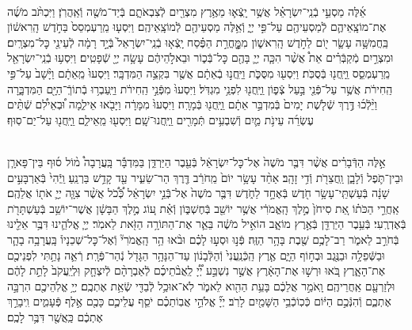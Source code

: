 \documentclass[twoside, openany, parskip=half, 11pt]{book}
\begin{document}
\begin{footnotesize}
\begin{multicols}{2}
\\
אֵ֜לֶּה מַסְעֵ֣י בְֿנֵֽי־יִשְׂרָאֵ֗ל אֲשֶׁ֥ר יָֽצְֿא֛וּ מֵאֶ֥רֶץ מִצְרַ֖יִם לְֿצִבְאֹתָ֑ם בְּֿיַד־מֹשֶׁ֖ה וְֿאַֽהֲרֹֽן׃ וַיִּכְתֹּ֨ב מֹשֶׁ֜ה אֶת־מוֹצָֽאֵיהֶ֛ם לְֿמַסְעֵיהֶ֖ם עַל־פִּ֣י יְיָ֑ וְֿאֵ֥לֶּה מַסְעֵיהֶ֖ם לְֿמוֹצָֽאֵיהֶֽם׃ וַיִּסְע֤וּ מֵֽרַעְמְסֵס֙ בַּחֹ֣דֶשׁ הָֽרִאשׁ֔וֹן בַּֽחֲמִשָּׁ֥ה עָשָׂ֛ר י֖וֹם לַחֹ֣דֶשׁ הָֽרִאשׁ֑וֹן מִמׇׇׇׇׇׇָּֽחֳרַ֣ת הַפֶּ֗סַח יָֽצְֿא֤וּ בְֿנֵֽי־יִשְׂרָאֵל֙ בְּֿיָ֣ד רָמָ֔ה לְֿעֵינֵ֖י כׇּל־מִצְרָֽיִם׃  וּמִצְרַ֣יִם מְֿקַבְּֿרִ֗ים אֵת֩ אֲשֶׁ֨ר הִכָּ֧ה יְיָ֛ בָּהֶ֖ם כׇּל־בְּֿכ֑וֹר וּבֵאלֹ֣הֵיהֶ֔ם עָשָׂ֥ה יְיָ֖ שְֿׁפָטִֽים׃ וַיִּסְע֥וּ בְֿנֵֽי־יִשְׂרָאֵ֖ל מֵֽרַעְמְסֵ֑ס וַֽיַּֽחֲנ֖וּ בְּֿסֻכֹּֽת׃ וַיִּסְע֖וּ מִסֻּכֹּ֑ת וַיַּֽחֲנ֣וּ בְֿאֵתָ֔ם אֲשֶׁ֖ר בִּקְצֵ֥ה הַמִּדְבָּֽר׃  וַיִּסְעוּ֙ מֵֽאֵתָ֔ם וַיָּ֨שָׁב֙ עַל־פִּ֣י הַֽחִירֹ֔ת אֲשֶׁ֥ר עַל־פְּֿנֵ֖י בַּ֣עַל צְֿפ֑וֹן וַֽיַּֽחֲנ֖וּ לִפְנֵ֥י מִגְדֹּֽל׃ וַיִּסְעוּ֙ מִפְּֿנֵ֣י הַֽחִירֹ֔ת וַיַּֽעַבְר֥וּ בְֿתוֹךְֿ־הַיָּ֖ם הַמִּדְבָּ֑רָה וַיֵּ֨לְֿכ֜וּ דֶּ֣רֶךְ שְֿׁלֹ֤שֶׁת יָמִים֙ בְּֿמִדְבַּ֣ר אֵתָ֔ם וַֽיַּֽחֲנ֖וּ בְּֿמָרָֽה׃ וַיִּסְעוּ֙ מִמָּרָ֔ה וַיָּבֹ֖אוּ אֵילִ֑מָה וּ֠בְאֵילִ֠ם שְֿׁתֵּ֨ים עֶשְׂרֵ֜ה עֵינֹ֥ת מַ֛יִם וְֿשִׁבְעִ֥ים תְּֿמָרִ֖ים וַֽיַּֽחֲנוּ־שָֽׁם׃ וַיִּסְע֖וּ מֵֽאֵילִ֑ם וַֽיַּֽחֲנ֖וּ עַל־יַם־סֽוּף׃

\\
אֵ֣לֶּה הַדְּֿבָרִ֗ים אֲשֶׁ֨ר דִּבֶּ֤ר מֹשֶׁה֙ אֶל־כׇּל־יִשְׂרָאֵ֔ל בְּֿעֵ֖בֶר הַיַּרְדֵּ֑ן בַּמִּדְבָּ֡ר בָּֽעֲרָבָה֩ מ֨וֹל ס֜וּף בֵּין־פָּארָ֧ן וּבֵין־תֹּ֛פֶל וְֿלָבָ֑ן וַֽחֲצֵרֹ֖ת וְֿדִ֥י זָהָֽב׃ אַחַ֨ד עָשָׂ֥ר יוֹם֙ מֵֽחֹרֵ֔ב דֶּ֖רֶךְ הַר־שֵׂעִ֑יר עַ֖ד קָדֵ֥שׁ בַּרְנֵֽעַ׃ וַֽיְֿהִי֙ בְּֿאַרְבָּעִ֣ים שָׁנָ֔ה בְּֿעַשְׁתֵּֽי־עָשָׂ֥ר חֹ֖דֶשׁ בְּֿאֶחָ֣ד לַחֹ֑דֶשׁ דִּבֶּ֤ר מֹשֶׁה֙ אֶל־בְּֿנֵ֣י יִשְׂרָאֵ֔ל כְּֿ֠כֹ֠ל אֲשֶׁ֨ר צִוָּ֧ה יְיָ֛ אֹת֖וֹ אֲלֵהֶֽם׃  אַֽחֲרֵ֣י הַכֹּת֗וֹ אֵ֚ת סִיחֹן֙ מֶ֣לֶךְ הָֽאֱמֹרִ֔י אֲשֶׁ֥ר יוֹשֵׁ֖ב בְּֿחֶשְׁבּ֑וֹן וְֿאֵ֗ת ע֚וֹג מֶ֣לֶךְ הַבָּשָׁ֔ן אֲשֶׁר־יוֹשֵׁ֥ב בְּֿעַשְׁתָּרֹ֖ת בְּֿאֶדְרֶֽעִי׃ בְּֿעֵ֥בֶר הַיַּרְדֵּ֖ן בְּֿאֶ֣רֶץ מוֹאָ֑ב הוֹאִ֣יל מֹשֶׁ֔ה בֵּאֵ֛ר אֶת־הַתּוֹרָ֥ה הַזֹּ֖את לֵאמֹֽר׃ יְיָ֧ אֱלֹהֵ֛ינוּ דִּבֶּ֥ר אֵלֵ֖ינוּ בְּֿחֹרֵ֣ב לֵאמֹ֑ר רַב־לָכֶ֥ם שֶׁ֖בֶת בָּהָ֥ר הַזֶּֽה׃ פְּֿנ֣וּ וּסְע֣וּ לָכֶ֗ם וּבֹ֨אוּ הַ֥ר הָֽאֱמֹרִי֘ וְֿאֶל־כׇּל־שְׁכֵנָיו֒ בָּֽעֲרָבָ֥ה בָהָ֛ר וּבַשְּֿׁפֵלָ֥ה וּבַנֶּ֖גֶב וּבְח֣וֹף הַיָּ֑ם אֶ֤רֶץ הַֽכְּֿנַֽעֲנִי֙ וְֿהַלְּֿבָנ֔וֹן עַד־הַנָּהָ֥ר הַגָּדֹ֖ל נְֿהַר־פְּֿרָֽת׃  רְֿאֵ֛ה נָתַ֥תִּי לִפְנֵיכֶ֖ם אֶת־הָאָ֑רֶץ בֹּ֚אוּ וּרְשׁ֣וּ אֶת־הָאָ֔רֶץ אֲשֶׁ֣ר נִשְׁבַּ֣ע יְ֠יָ֠ לַֽאֲבֹ֨תֵיכֶ֜ם לְֿאַבְרָהָ֨ם לְֿיִצְחָ֤ק וּֽלְיַֽעֲקֹב֙ לָתֵ֣ת לָהֶ֔ם וּלְזַרְעָ֖ם אַֽחֲרֵיהֶֽם׃ וָֽאֹמַ֣ר אֲלֵכֶ֔ם בָּעֵ֥ת הַהִ֖וא לֵאמֹ֑ר לֹֽא־אוּכַ֥ל לְֿבַדִּ֖י שְֿׂאֵ֥ת אֶתְכֶֽם׃ יְיָ֥ אֱלֹֽהֵיכֶ֖ם הִרְבָּ֣ה אֶתְכֶ֑ם וְֿהִנְּֿכֶ֣ם הַיּ֔וֹם כְּֿכֽוֹכְֿבֵ֥י הַשָּׁמַ֖יִם לָרֹֽב׃ יְיָ֞ אֱלֹהֵ֣י אֲבֽוֹתֵכֶ֗ם יֹסֵ֧ף עֲלֵיכֶ֛ם כָּכֶ֖ם אֶ֣לֶף פְּֿעָמִ֑ים וִֽיבָרֵ֣ךְ אֶתְכֶ֔ם כַּֽאֲשֶׁ֖ר דִּבֶּ֥ר לָכֶֽם׃


\end{multicols}
\end{footnotesize}
\end{document}
